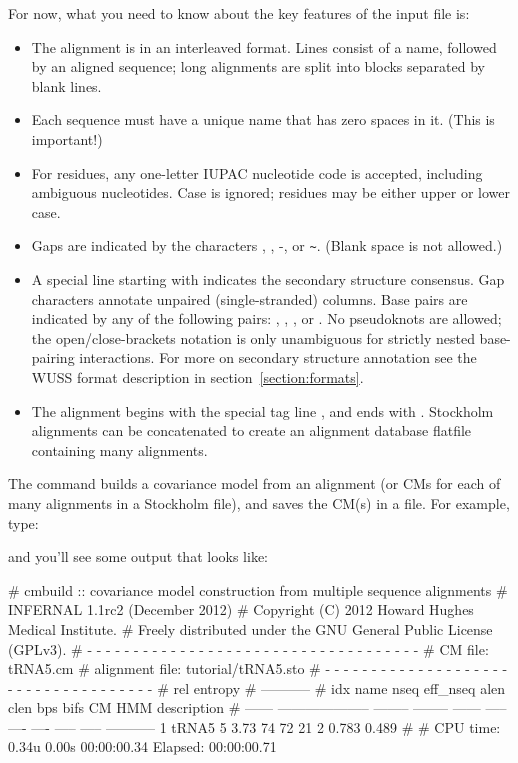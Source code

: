 For now, what you need to know about the key features of the input file is:
\begin{itemize}
\item The alignment is in an interleaved format.
Lines consist of a name, followed by an aligned sequence;
long alignments are split into blocks separated by blank lines.
\item Each sequence must have a unique name that has zero spaces in it. (This is important!)
\item For residues, any one-letter IUPAC nucleotide code is accepted,
      including ambiguous nucleotides. Case is ignored; residues
      may be either upper or lower case.
\item Gaps are indicated by the characters , \otext{\_}, -, or \verb+~+.
      (Blank space is not allowed.)
\item A special line starting with  indicates
      the secondary structure consensus. Gap characters annotate
      unpaired (single-stranded) columns. Base pairs are indicated
      by any of the following pairs: \otext{<>}, \otext{()}, \otext{[]},
      or \otext{\{\}}. No pseudoknots are allowed; the
      open/close-brackets notation is only unambiguous for strictly
      nested base-pairing interactions.
      For more on secondary structure annotation see the WUSS format
      description in section~\ref{section:formats}.
\item The alignment begins with the special tag line
      , and ends with \otext{//}.
      Stockholm alignments
      can be concatenated to create an alignment database flatfile
      containing many alignments.
\end{itemize}

The  command builds a covariance model from an alignment (or
CMs for each of many alignments in a Stockholm file), and saves the
CM(s) in a file. For example, type:


and you'll see some output that looks like:

\begin{sreoutput}
# cmbuild :: covariance model construction from multiple sequence alignments
# INFERNAL 1.1rc2 (December 2012)
# Copyright (C) 2012 Howard Hughes Medical Institute.
# Freely distributed under the GNU General Public License (GPLv3).
# - - - - - - - - - - - - - - - - - - - - - - - - - - - - - - - - - - - -
# CM file:                                            tRNA5.cm
# alignment file:                                     tutorial/tRNA5.sto
# - - - - - - - - - - - - - - - - - - - - - - - - - - - - - - - - - - - -
#                                                                      rel entropy
#                                                                      -----------
# idx    name                     nseq eff_nseq   alen  clen  bps bifs    CM   HMM description
# ------ -------------------- -------- -------- ------ ----- ---- ---- ----- ----- -----------
       1 tRNA5                       5     3.73     74    72   21    2 0.783 0.489 
#
# CPU time: 0.34u 0.00s 00:00:00.34 Elapsed: 00:00:00.71
\end{sreoutput}

